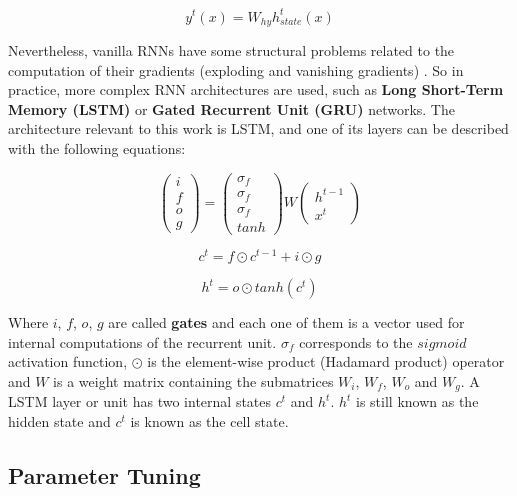 \begin{equation}
    y^{t}(x) = W_{hy}h_{state}^{t}(x)
\end{equation}

Nevertheless, vanilla RNNs have some structural problems related to the computation of their gradients (exploding and vanishing gradients) \cite{bengio1994learning, pascanu2013difficulty}. So in practice, more complex RNN architectures are used, such as \textbf{Long Short-Term Memory (LSTM)} \cite{hochreiter1997long} or \textbf{Gated Recurrent Unit (GRU)} \cite{cho2014learning} networks. The architecture relevant to this work is LSTM, and one of its layers can be described with the following equations:

\begin{equation}
    \begin{pmatrix} i \\ f \\ o \\ g \end{pmatrix} = \begin{pmatrix} \sigma_{f} \\ \sigma_{f} \\ \sigma_{f} \\ tanh \end{pmatrix} W \begin{pmatrix} h^{t-1} \\ x^{t} \end{pmatrix} 
\end{equation}

\begin{equation}
    c^{t} = f \odot c^{t-1} + i \odot g
\end{equation}

\begin{equation}
    h^{t} = o \odot tanh(c^{t})
\end{equation}

Where $i$, $f$, $o$, $g$ are called \textbf{gates} and each one of them is a vector used for internal computations of the recurrent unit. $\sigma_{f}$ corresponds to the $sigmoid$ activation function, $\odot$ is the element-wise product (Hadamard product) operator and $W$ is a weight matrix containing the submatrices $W_{i}$, $W_{f}$, $W_{o}$ and $W_{g}$. A LSTM layer or unit has two internal states $c^{t}$ and $h^{t}$. $h^{t}$ is still known as the hidden state and $c^{t}$ is known as the cell state.

\subsection{Parameter Tuning}

